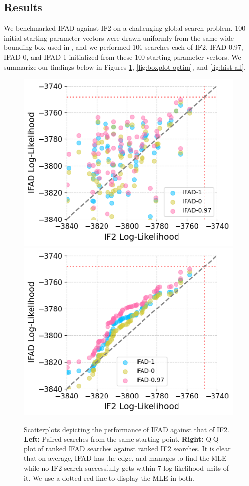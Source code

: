 \documentclass{article}
\begin{document}
\subsection{Results} 
We benchmarked IFAD against IF2 on a challenging global search problem. 100 initial starting parameter vectors were drawn uniformly from the same wide bounding box used in \cite{ionides15}, and we performed 100 searches each of IF2, IFAD-0.97, IFAD-0, and IFAD-1 initialized from these 100 starting parameter vectors. We summarize our findings below in Figures \ref{fig:scatter}, \ref{fig:boxplot-optim}, and \ref{fig:hist-all}. 


\begin{figure}[htbp!]
    \centering
    \includegraphics[scale=0.53]{../imgs/095/pairs.png}
    \includegraphics[scale=0.53]{../imgs/095/qq.png}
    \caption{Scatterplots depicting the performance of IFAD against that of IF2. \textbf{Left:} Paired searches from the same starting point. \textbf{Right:} Q-Q plot of ranked IFAD searches against ranked IF2 searches. It is clear that on average, IFAD has the edge, and manages to find the MLE while no IF2 search successfully gets within 7 log-likelihood units of it. We use a dotted red line to display the MLE in both. }

    \label{fig:scatter}
\end{figure}
\end{document}

